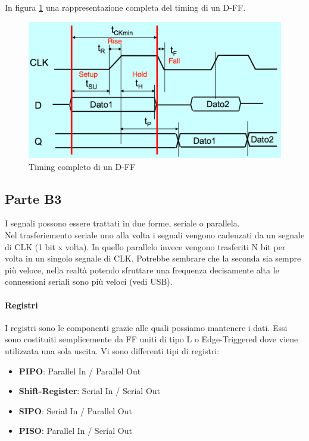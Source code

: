 \documentclass[12pt]{article}
\begin{document}
In figura \ref{fig:timingdff} una rappresentazione completa del timing di un D-FF.
\begin{figure}[!hp]
  \includegraphics[width=\textwidth]{images/timingdff.png}
  \caption{Timing completo di un D-FF}
  \label{fig:timingdff}
\end{figure}

\subsection{Parte B3}\label{b3}
I segnali possono essere trattati in due forme, seriale o parallela.\\
 Nel trasferiemento seriale uno alla volta i segnali vengono cadenzati da un segnale di CLK (1 bit x volta). In quello parallelo invece vengono trasferiti N bit per volta in un singolo segnale di CLK. Potrebbe sembrare che la seconda sia sempre più veloce, nella realtà potendo sfruttare una frequenza decisamente alta le connessioni seriali sono più veloci (vedi USB).

\paragraph{Registri}
I registri sono le componenti grazie alle quali possiamo mantenere i dati. Essi sono costituiti semplicemente da FF uniti di tipo L o Edge-Triggered dove viene utilizzata una sola uscita. Vi sono differenti tipi di registri:
\begin{itemize}
  \item \textbf{PIPO}: Parallel In / Parallel Out
  \item \textbf{Shift-Register}: Serial In / Serial Out
  \item \textbf{SIPO}: Serial In / Parallel Out
  \item \textbf{PISO}: Parallel In / Serial Out
\end{itemize}
\end{document}

